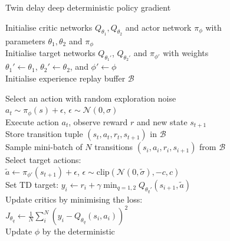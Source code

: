 \begin{algorithm}[hbt!]
\caption{Twin delay deep deterministic policy gradient}\label{alg:td3}
Initialise critic networks $Q_{\theta_1}, Q_{\theta_2}$ and actor network $\pi_\phi$ 
with \\
\nonl parameters $\theta_1, \theta_2$ and $\pi_\phi$ \\
Initialise target networks $Q_{\theta_1'}$, $Q_{\theta_2'}$ and $\pi_{\phi'}$ with weights \\
\nonl $\theta_1' \leftarrow \theta_1$, $\theta_2' \leftarrow \theta_2$, and $\phi' \leftarrow \phi$ \\
Initialise experience replay buffer $\mathcal{B}$ \\
{

    {
        Select an action with random exploration noise \\
        \nonl $a_t \sim \pi_{\phi}(s) + \epsilon$, $\epsilon \sim \mathcal{N}(0, \sigma)$ \\
        Execute action $a_t$, observe reward $r$ and new state $s_{t+1}$ \\
        Store transition tuple $(s_t,a_t,r_t,s_{t+1})$ in $\mathcal{B}$ \\
        Sample mini-batch of $N$ transitions $(s_i,a_i,r_i,s_{i+1})$ from $\mathcal{B}$ \\
        Select target actions:\\
        \nonl $\tilde{a} \leftarrow \pi_{\phi'}(s_{t+1}) + \epsilon$, $\epsilon \sim \text{clip}(\mathcal{N}(0,\tilde{\sigma}), -c,c)$ \\
        Set TD target:
        $y_i \leftarrow r_i + \gamma \min_{q=1,2} Q_{\theta_q'}(s_{i+1}, \tilde{a})$ \\
        Update critics by minimising the loss: \hspace{1.8cm}
             \\
        \nonl $J_{\theta_q} \leftarrow  \frac{1}{N} \sum_{i}^{N} (y_i - Q_{\theta_q}(s_i,a_i))^{2} $ \\
        {
            Update $\phi$ by the deterministic \\
}}}
\end{algorithm}
